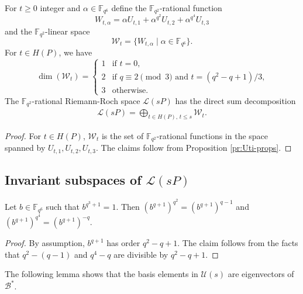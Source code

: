 \documentclass[entropy,article,submit,pdftex,moreauthors]{Definitions/mdpi}
\begin{document}
\begin{Theorem} \label{th:Wt-props}
For $t\geq 0$ integer and $\alpha \in \mathbb{F}_{q^6}$ define the $\mathbb{F}_{q^2}$-rational function 
\[W_{t,\alpha} = \alpha U_{t,1} + \alpha^{q^2} U_{t,2} + \alpha^{q^4} U_{t,3}\]
and the $\mathbb{F}_{q^2}$-linear space
\[\mathcal{W}_t = \{W_{t,\alpha} \mid \alpha \in \mathbb{F}_{q^6}\}.\]
For $t\in H(P)$, we have
\[\dim(\mathcal{W}_t) = \begin{cases}
1 & \text{if $t=0$,} \\
2 & \text{if $q\equiv 2\pmod3$ and $t=(q^2-q+1)/3$,} \\
3 & \text{otherwise.}
\end{cases}\]
The $\mathbb{F}_{q^2}$-rational Riemann-Roch space $\mathscr{L}(sP)$ has the direct sum decomposition
\begin{align} \label{eq:LsP-decomp}
\mathscr{L}(sP) = \bigoplus_{t\in H(P), \, t\leq s} \mathcal{W}_t.
\end{align}
\end{Theorem}
\begin{proof}
For $t\in H(P)$, $\mathcal{W}_t$ is the set of $\mathbb{F}_{q^2}$-rational functions in the space spanned by $U_{t,1}, U_{t,2}, U_{t,3}$. The claims follow from Proposition \ref{pr:Uti-props}. 
\end{proof}

\subsection{Invariant subspaces of $\mathscr{L}(sP)$}

\begin{Lemma} \label{lm:b-q+1}
Let $b\in \mathbb{F}_{q^6}$ such that $b^{q^3+1}=1$. Then $(b^{q+1})^{q^2}=(b^{q+1})^{q-1}$ and $(b^{q+1})^{q^4}=(b^{q+1})^{-q}$.
\end{Lemma}
\begin{proof}
By assumption, $b^{q+1}$ has order $q^2-q+1$. The claim follows from the facts that $q^2-(q-1)$ and $q^4-q$ are divisible by $q^2-q+1$. 
\end{proof}

The following lemma shows that the basis elements in $\mathcal{U}(s)$ are eigenvectors of $\mathcal{B}^*$. 
\end{document}
